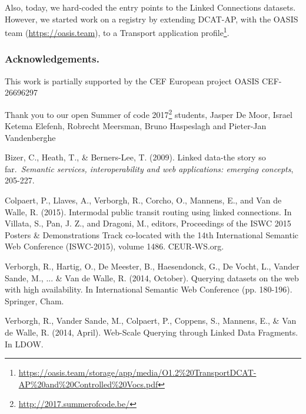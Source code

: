 \documentclass[runningheads,a4paper]{llncs}
\begin{document}
Also, today, we hard-coded the entry points to the Linked Connections datasets. However, we started work on a registry by extending DCAT-AP, with the OASIS team (\url{https://oasis.team}), to a Transport application profile\footnote{\url{https://oasis.team/storage/app/media/O1.2%20TransportDCAT-AP%20and%20Controlled%20Vocs.pdf}}.

\subsubsection*{Acknowledgements.}This work is partially supported by the CEF European project OASIS CEF-26696297

Thank you to our open Summer of code 2017\footnote{\url{http://2017.summerofcode.be/}} students, Jasper De Moor, Israel Ketema Elefenh, Robrecht Meersman, Bruno Haspeslagh and Pieter-Jan Vandenberghe


\begin{thebibliography}{4}


Bizer, C., Heath, T., \& Berners-Lee, T. (2009). Linked data-the story so far. {\em Semantic services, interoperability and web applications: emerging concepts}, 205-227.

Colpaert, P., Llaves, A., Verborgh, R., Corcho, O., Mannens, E., and Van de Walle, R. (2015). Intermodal public transit routing using linked connections. In Villata, S., Pan, J. Z., and Dragoni, M., editors, Proceedings of the ISWC 2015 Posters \& Demonstrations Track co-located with the 14th International Semantic Web Conference (ISWC-2015), volume 1486. CEUR-WS.org.

Verborgh, R., Hartig, O., De Meester, B., Haesendonck, G., De Vocht, L., Vander Sande, M., ... \& Van de Walle, R. (2014, October). Querying datasets on the web with high availability. In International Semantic Web Conference (pp. 180-196). Springer, Cham.

Verborgh, R., Vander Sande, M., Colpaert, P., Coppens, S., Mannens, E., \& Van de Walle, R. (2014, April). Web-Scale Querying through Linked Data Fragments. In LDOW.

\end{thebibliography}
\end{document}
